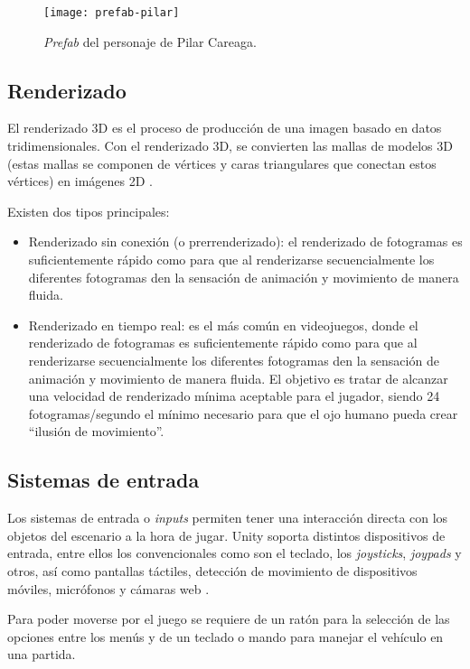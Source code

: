 \begin{figure}[h]
	\centering
	\texttt{[image: prefab-pilar]}
	\caption{\textit{Prefab} del personaje de Pilar Careaga.}
	\label{fig:prefab-pilar}
\end{figure}

\subsection{Renderizado}

El renderizado 3D es el proceso de producción de una imagen basado en datos tridimensionales. Con el renderizado 3D, se convierten las mallas de modelos 3D (estas mallas se componen de vértices y caras triangulares que conectan estos vértices) en imágenes 2D \cite{doc:renderer}. 

Existen dos tipos principales:
\begin{itemize}
\tightlist
	\item Renderizado sin conexión (o prerrenderizado): el renderizado de fotogramas es suficientemente rápido como para que al renderizarse secuencialmente los diferentes fotogramas den la sensación de animación y movimiento de manera fluida.
	\item Renderizado en tiempo real: es el más común en videojuegos, donde el renderizado de fotogramas es suficientemente rápido como para que al renderizarse secuencialmente los diferentes fotogramas den la sensación de animación y movimiento de manera fluida. El objetivo es tratar de alcanzar una velocidad de renderizado mínima aceptable para el jugador, siendo 24 fotogramas/segundo el mínimo necesario para que el ojo humano pueda crear ``ilusión de movimiento''.
\end{itemize}

\subsection{Sistemas de entrada}

Los sistemas de entrada o \textit{inputs} permiten tener una interacción directa con los objetos del escenario a la hora de jugar. Unity soporta distintos dispositivos de entrada, entre ellos los convencionales como son el teclado, los \textit{joysticks}, \textit{joypads} y otros, así como pantallas táctiles, detección de movimiento de dispositivos móviles, micrófonos y cámaras web \cite{doc:input}.

Para poder moverse por el juego se requiere de un ratón para la selección de las opciones entre los menús y de un teclado o mando para manejar el vehículo en una partida.

